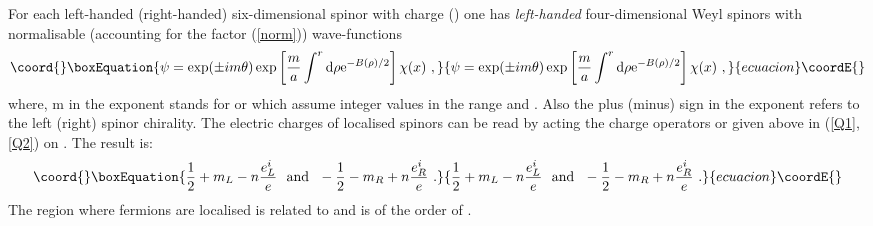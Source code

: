 \documentclass[a4paper,12pt]{article}
\begin{document}
For each left-handed (right-handed) six-dimensional spinor with
charge \coordHE{} (\coordHE{}) one has  {\it left-handed} four-dimensional
Weyl spinors with normalisable (accounting for the factor
(\ref{norm})) wave-functions
\begin{equation}\coord{}\boxEquation{
\psi=\exp(\pm im\theta)\exp\left[\frac{m}{a} \int^r{\rm
d}\rho{\rm e}^{-B(\rho)/2}\right]\chi(x)~,
}{
\psi=\exp(\pm im\theta)\exp\left[\frac{m}{a} \int^r{\rm
d}\rho{\rm e}^{-B(\rho)/2}\right]\chi(x)~,
}{ecuacion}\coordE{}\end{equation}
where, m in the exponent stands for \coordHE{} or \coordHE{}  which assume  
integer values in the range
\coordHE{} and \coordHE{}. Also  
the plus (minus) sign  in the exponent refers to  the left (right)
\coordHE{} spinor chirality. The \coordHE{} electric charges of localised
spinors can be read by acting the charge operators \coordHE{} or \coordHE{}
given above in (\ref{Q1},\ref{Q2}) on \myHighlight{$\psi$}\coordHE{}. The result is:
\begin{equation}\coord{}\boxEquation{
\frac{1}{2} + m_L -n\frac{e_L^i}{e}~~ \mbox{and}~~ -\frac{1}{2} - m_R
+n\frac{e_R^i}{e}~.
}{
\frac{1}{2} + m_L -n\frac{e_L^i}{e}~~ \mbox{and}~~ -\frac{1}{2} - m_R
+n\frac{e_R^i}{e}~.
}{ecuacion}\coordE{}\end{equation}
The region where \coordHE{} fermions are localised is related to \coordHE{} and
is of the order of \coordHE{}.
\end{document}
